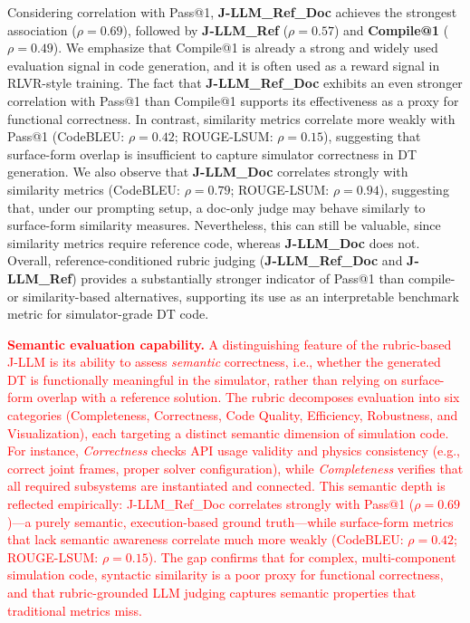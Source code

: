 \documentclass{ieeeaccess}
\newcommand{\updatedText}[1]{\textcolor{red}{#1}}
\newcommand{\noindentBold}[1]{\par\noindent\textbf{#1}}
\begin{document}
Considering correlation with Pass@1, \textbf{J-LLM\_Ref\_Doc} achieves the strongest association ($\rho=0.69$), followed by \textbf{J-LLM\_Ref} ($\rho=0.57$) and \textbf{Compile@1} ($\rho=0.49$).
We emphasize that Compile@1 is already a strong and widely used evaluation signal in code generation, and it is often used as a reward signal in RLVR-style training.
The fact that \textbf{J-LLM\_Ref\_Doc} exhibits an even stronger correlation with Pass@1 than Compile@1 supports its effectiveness as a proxy for functional correctness.
In contrast, similarity metrics correlate more weakly with Pass@1 (CodeBLEU: $\rho=0.42$; ROUGE-LSUM: $\rho=0.15$), suggesting that surface-form overlap is insufficient to capture simulator correctness in DT generation.
We also observe that \textbf{J-LLM\_Doc} correlates strongly with similarity metrics (CodeBLEU: $\rho=0.79$; ROUGE-LSUM: $\rho=0.94$), suggesting that, under our prompting setup, a doc-only judge may behave similarly to surface-form similarity measures. Nevertheless, this can still be valuable, since similarity metrics require reference code, whereas \textbf{J-LLM\_Doc} does not.
Overall, reference-conditioned rubric judging (\textbf{J-LLM\_Ref\_Doc} and \textbf{J-LLM\_Ref}) provides a substantially stronger indicator of Pass@1 than compile- or similarity-based alternatives, supporting its use as an interpretable benchmark metric for simulator-grade DT code.

\updatedText{\noindentBold{Semantic evaluation capability.}
A distinguishing feature of the rubric-based J-LLM is its ability to assess \emph{semantic} correctness, i.e., whether the generated DT is functionally meaningful in the simulator, rather than relying on surface-form overlap with a reference solution.
The rubric decomposes evaluation into six categories (Completeness, Correctness, Code Quality, Efficiency, Robustness, and Visualization), each targeting a distinct semantic dimension of simulation code.
For instance, \emph{Correctness} checks API usage validity and physics consistency (e.g., correct joint frames, proper solver configuration), while \emph{Completeness} verifies that all required subsystems are instantiated and connected.
This semantic depth is reflected empirically: J-LLM\_Ref\_Doc correlates strongly with Pass@1 ($\rho = 0.69$)---a purely semantic, execution-based ground truth---while surface-form metrics that lack semantic awareness correlate much more weakly (CodeBLEU: $\rho = 0.42$; ROUGE-LSUM: $\rho = 0.15$).
The gap confirms that for complex, multi-component simulation code, syntactic similarity is a poor proxy for functional correctness, and that rubric-grounded LLM judging captures semantic properties that traditional metrics miss.}
\end{document}

